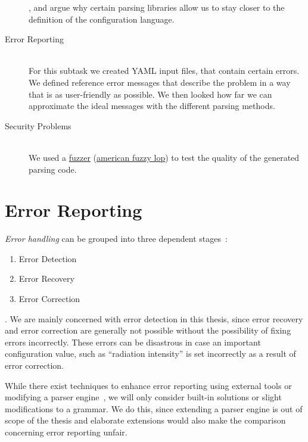 \begin{description}
  \closeness*

  , and argue why certain parsing libraries allow us to stay closer to the definition of the configuration language.

  \item[Error Reporting]~\\[0.1cm]
  For this subtask we created YAML input files, that contain certain errors. We defined reference error messages that describe the problem in a way that is as user-friendly as possible. We then looked how far we can approximate the ideal messages with the different parsing methods.

  \item[Security Problems]~\\[0.1cm]
  We used a \href{https://en.wikipedia.org/wiki/Fuzzing}{fuzzer} (\href{http://lcamtuf.coredump.cx/afl}{american fuzzy lop}) to test the quality of the generated parsing code.

\end{description}

\section{Error Reporting}

\emph{Error handling} can be grouped into three dependent stages~\cite{ruefenacht2016error}:

\begin{enumerate}
  \item Error Detection
  \item Error Recovery
  \item Error Correction
\end{enumerate}

. We are mainly concerned with error detection in this thesis, since error recovery and error correction are generally not possible without the possibility of fixing errors incorrectly. These errors can be disastrous in case an important configuration value, such as “radiation intensity” is set incorrectly as a result of error correction.

While there exist techniques to enhance error reporting using external tools or modifying a parser engine~\cite{jeffery2003generating, cox2010errors}, we will only consider built-in solutions or slight modifications to a grammar. We do this, since extending a parser engine is out of scope of the thesis and elaborate extensions would also make the comparison concerning error reporting unfair.

